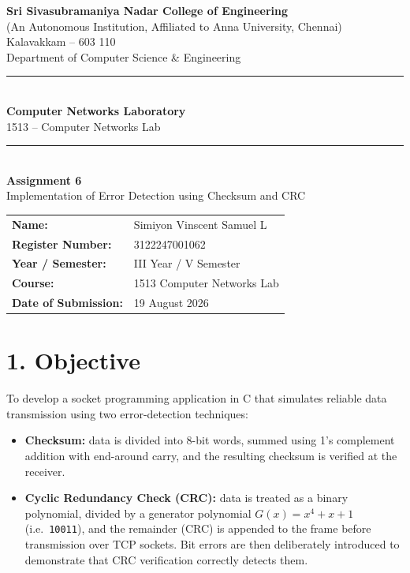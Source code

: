 \documentclass[11pt]{article}
\title{\vspace{-2cm}}
\date{}
\begin{document}
\begin{titlepage}
\centering
\vspace*{1cm}
{\large \textbf{Sri Sivasubramaniya Nadar College of Engineering}}\\
{\small (An Autonomous Institution, Affiliated to Anna University, Chennai)}\\
{\small Kalavakkam -- 603 110}\\[0.3cm]
{\small Department of Computer Science \& Engineering}\\[1.5cm]

\rule{\linewidth}{0.5mm}\\[0.4cm]
{\LARGE \textbf{Computer Networks Laboratory}}\\[0.3cm]
{\Large 1513 -- Computer Networks Lab}\\[0.4cm]
\rule{\linewidth}{0.5mm}\\[1.5cm]

{\huge \textbf{Assignment 6}}\\[0.4cm]
{\Large Implementation of Error Detection using Checksum and CRC}\\[2cm]

\begin{center}
\begin{tabular}{ll}
\textbf{Name:} & Simiyon Vinscent Samuel L \\[0.2cm]
\textbf{Register Number:} & 3122247001062 \\[0.2cm]
\textbf{Year / Semester:} & III Year / V Semester \\[0.2cm]
\textbf{Course:} & 1513 Computer Networks Lab \\[0.2cm]
\textbf{Date of Submission:} & 19 August 2026 \\[0.2cm]
\end{tabular}
\end{center}

\vfill
\end{titlepage}

\section*{1. Objective}
To develop a socket programming application in C that simulates reliable data transmission using
two error-detection techniques:
\begin{itemize}
  \item \textbf{Checksum:} data is divided into 8-bit words, summed using 1's complement addition
        with end-around carry, and the resulting checksum is verified at the receiver.
  \item \textbf{Cyclic Redundancy Check (CRC):} data is treated as a binary polynomial, divided by
        a generator polynomial $G(x) = x^4+x+1$ (i.e.\ \texttt{10011}), and the remainder (CRC) is
        appended to the frame before transmission over TCP sockets. Bit errors are then
        deliberately introduced to demonstrate that CRC verification correctly detects them.
\end{itemize}
\end{document}
